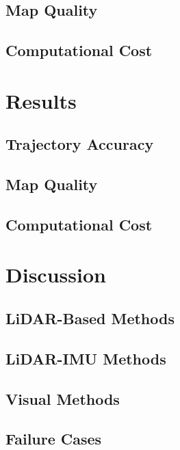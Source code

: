 \subsection{Map Quality}

\subsection{Computational Cost}

\section{Results}



\subsection{Trajectory Accuracy}

\subsection{Map Quality}

\subsection{Computational Cost}

\section{Discussion}

\subsection{LiDAR-Based Methods}

\subsection{LiDAR-IMU Methods}

\subsection{Visual Methods}

\subsection{Failure Cases}
